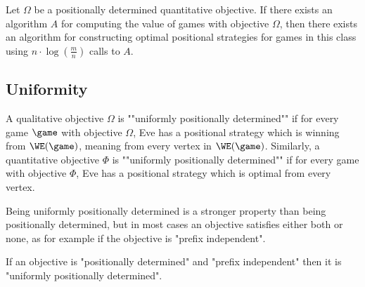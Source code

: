 \begin{lemma}
\label{1-lem:constructing_winning_strategy_quantitative}
Let $\Omega$ be a positionally determined quantitative objective.
If there exists an algorithm $A$ for computing the value of games with objective $\Omega$,
then there exists an algorithm for constructing optimal positional strategies for games in this class 
using $n \cdot \log(\frac{m}{n})$ calls to $A$.
\end{lemma}

\subsection*{Uniformity}
A qualitative objective $\Omega$ is ""uniformly positionally determined"" if for every game $\game$ with objective $\Omega$, 
Eve has a positional strategy which is winning from $\WE(\game)$, meaning from every vertex in $\WE(\game)$.
Similarly, a quantitative objective $\Phi$ is ""uniformly positionally determined"" if for every game with objective $\Phi$, 
Eve has a positional strategy which is optimal from every vertex.

Being uniformly positionally determined is a stronger property than being positionally determined, but in most cases an objective satisfies either both or none, as for example if the objective is "prefix independent".

\begin{lemma}\label{1-lem:from_positional_to_uniformly_positional}
If an objective is "positionally determined" and "prefix independent" then it is "uniformly positionally determined".
\end{lemma}

